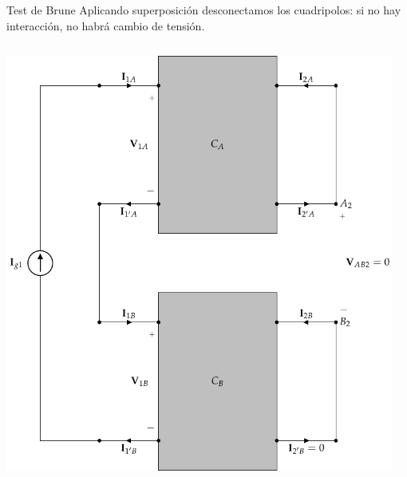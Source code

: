 \documentclass[aspectratio=169, usenames,svgnames,dvipsnames]{beamer}
\begin{document}
\begin{frame}[label={sec:org8e219e8},plain]{Test de Brune}
Aplicando superposición desconectamos los cuadripolos: \alert{si no hay interacción, no habrá cambio de tensión}.
\begin{columns}
\begin{column}{0.5\columnwidth}
\begin{center}
\includegraphics[height=0.8\textheight]{../figs/serie-paralelo-brune-entrada.pdf}
\end{center}
\end{column}
\begin{column}{0.5\columnwidth}
\begin{center}

\end{center}
\end{column}
\end{columns}
\end{frame}
\end{document}
